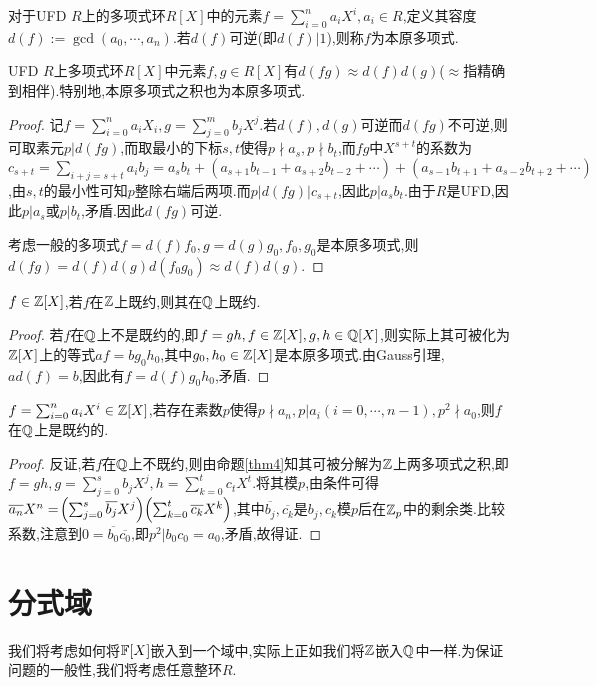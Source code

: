 \documentclass[openany]{book}
\begin{document}
\begin{definition}
    对于UFD $R$上的多项式环$R[X]$中的元素$f=\sum_{i=0}^n a_iX^i, a_i\in R$,定义其容度$d(f):=\gcd(a_0,\cdots,a_n)$.若$d(f)$可逆(即$d(f)|1$),则称$f$为本原多项式.
\end{definition}
\begin{theorem}[Gauss引理]
    UFD $R$上多项式环$R[X]$中元素$f,g\in R[X]$有$d(fg)\approx d(f)d(g)$($\approx$指精确到相伴).特别地,本原多项式之积也为本原多项式.
\end{theorem}
\begin{proof}
    记$f=\sum_{i=0}^n a_iX_i, g=\sum_{j=0}^m b_jX^j$.若$d(f),d(g)$可逆而$d(fg)$不可逆,则可取素元$p|d(fg)$,而取最小的下标$s,t$使得$p\nmid a_s, p\nmid b_t$,而$fg$中$X^{s+t}$的系数为$c_{s+t}=\sum_{i+j=s+t}a_ib_j=a_sb_t+(a_{s+1}b_{t-1}+a_{s+2}b_{t-2}+\cdots)+(a_{s-1}b_{t+1}+a_{s-2}b_{t+2}+\cdots)$,由$s,t$的最小性可知$p$整除右端后两项.而$p|d(fg)|c_{s+t}$,因此$p|a_sb_t$.由于$R$是UFD,因此$p|a_s$或$p|b_t$,矛盾.因此$d(fg)$可逆.

    考虑一般的多项式$f=d(f)f_0, g=d(g)g_0, f_0,g_0$是本原多项式,则$d(fg)=d(f)d(g)d(f_0g_0)\approx d(f)d(g)$.
\end{proof}
\begin{proposition}\label{thm4}
    $f\in \mathbb{Z}[X]$,若$f$在$\mathbb{Z}$上既约,则其在$\mathbb{Q}$上既约.
\end{proposition}
\begin{proof}
    若$f$在$\mathbb{Q}$上不是既约的,即$f=gh, f\in \mathbb{Z}[X],g,h\in\mathbb{Q}[X]$,则实际上其可被化为$\mathbb{Z}[X]$上的等式$af=bg_0h_0$,其中$g_0,h_0\in \mathbb{Z}[X]$是本原多项式.由Gauss引理,$ad(f)=b$,因此有$f=d(f)g_0h_0$,矛盾.
\end{proof}
\begin{theorem}[Eisenstein判别法]
    $f=\sum_{i=0}^n a_iX^i\in \mathbb{Z}[X]$,若存在素数$p$使得$p\nmid a_n, p|a_i(i=0,\cdots,n-1), p^2\nmid a_0$,则$f$在$\mathbb{Q}$上是既约的.
\end{theorem}
\begin{proof}
    反证,若$f$在$\mathbb{Q}$上不既约,则由命题\ref{thm4}知其可被分解为$\mathbb{Z}$上两多项式之积,即$f=gh, g=\sum_{j=0}^s b_jX^j, h=\sum_{k=0}^t c_tX^t$.将其模$p$,由条件可得$\overline{a_n}X^n=\!\left(\sum_{j=0}^s \overline{b_j}X^j\right)\!\left(\sum_{k=0}^t \overline{c_k}X^k\right)$,其中$\overline{b_j},\overline{c_k}$是$b_j,c_k$模$p$后在$\mathbb{Z}_p$中的剩余类.比较系数,注意到$0=\overline{b_0}\overline{c_0}$,即$p^2|b_0c_0=a_0$,矛盾,故得证.
\end{proof}

\section{分式域}
我们将考虑如何将$\mathbb{F}[X]$嵌入到一个域中,实际上正如我们将$\mathbb{Z}$嵌入$\mathbb{Q}$中一样.为保证问题的一般性,我们将考虑任意整环$R$.
\end{document}
